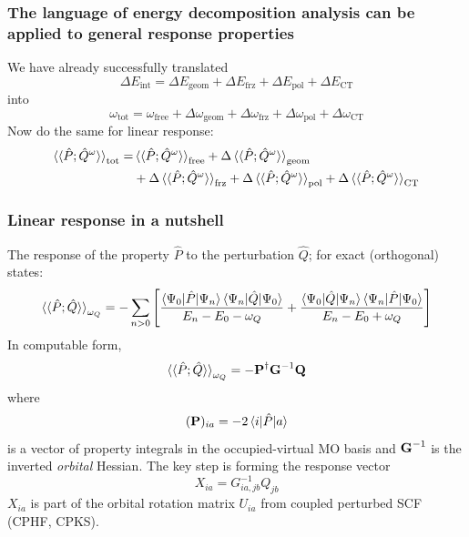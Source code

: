 \documentclass[%
    xcolor=usenames,dvipsnames,svgnames%
]{beamer}
\begin{document}
\begin{frame}
  \frametitle{The language of energy decomposition analysis can be applied to general response properties}
  We have already successfully translated
  \begin{equation*}
    \Delta E_{\text{int}} = \Delta E_{\text{geom}} + \Delta E_{\text{frz}} + \Delta E_{\text{pol}} + \Delta E_{\text{CT}}
  \end{equation*}
  into
  \begin{equation*}
    \omega_{\text{tot}} = \omega_{\text{free}} + \Delta \omega_{\text{geom}} + \Delta \omega_{\text{frz}} + \Delta \omega_{\text{pol}} + \Delta \omega_{\text{CT}}
  \end{equation*}
  Now do the same for linear response:
  \begin{equation*}
    \begin{aligned}
      \braket{\braket{\hat{P};\hat{Q}^{\omega}}}_{\text{tot}} = &\braket{\braket{\hat{P};\hat{Q}^{\omega}}}_{\text{free}} + \Delta \braket{\braket{\hat{P};\hat{Q}^{\omega}}}_{\text{geom}} \\
      &+ \Delta \braket{\braket{\hat{P};\hat{Q}^{\omega}}}_{\text{frz}} + \Delta \braket{\braket{\hat{P};\hat{Q}^{\omega}}}_{\text{pol}} + \Delta \braket{\braket{\hat{P};\hat{Q}^{\omega}}}_{\text{CT}}
    \end{aligned}
  \end{equation*}
\end{frame}

\begin{frame}
  \frametitle{Linear response in a nutshell}
  The response of the property \(\hat{P}\) to the perturbation \(\hat{Q}\); for exact (orthogonal) states:
  \begin{equation*}
    \braket{\braket{\hat{P};\hat{Q}}}_{\omega_{Q}} = - \sum_{n>0} \left[ \frac{\braket{\Psi_{0}|\hat{P}|\Psi_{n}}\braket{\Psi_{n}|\hat{Q}|\Psi_{0}}}{E_{n} - E_{0} - \omega_{Q}} + \frac{\braket{\Psi_{0}|\hat{Q}|\Psi_{n}}\braket{\Psi_{n}|\hat{P}|\Psi_{0}}}{E_{n} - E_{0} + \omega_{Q}} \right]
  \end{equation*}
  In computable form,
  \begin{equation*}
    \braket{\braket{\hat{P};\hat{Q}}}_{\omega_{Q}} = - \boldsymbol{\mathbf{P}}^{\dagger} \boldsymbol{\mathbf{G}}^{-1} \boldsymbol{\mathbf{Q}}
  \end{equation*}
  where
  \begin{equation*}
    (\boldsymbol{\mathbf{P}})_{ia} = -2 \braket{ i | \hat{P} | a }
  \end{equation*}
  is a vector of property integrals in the occupied-virtual MO basis and \(\boldsymbol{\mathbf{G}}^{-1}\) is the inverted \emph{orbital} Hessian. The key step is forming the response vector
  \begin{equation*}
    X_{ia} = G_{ia,jb}^{-1} Q_{jb}
  \end{equation*}
  \(X_{ia}\) is part of the orbital rotation matrix \(U_{ia}\) from coupled perturbed SCF (CPHF, CPKS).
\end{frame}
\end{document}
